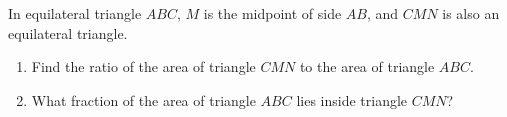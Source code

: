 In equilateral triangle $ABC$, $M$ is the midpoint of side $AB$, and $CMN$ is also an equilateral triangle.
\begin{enumerate}
\item[(a)] Find the ratio of the area of triangle $CMN$ to the area of triangle $ABC$.
\item[(b)] What fraction of the area of triangle $ABC$ lies inside triangle $CMN$?
\end{enumerate}
